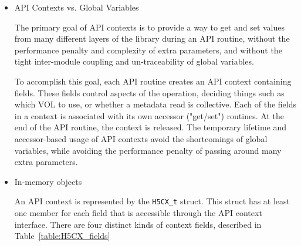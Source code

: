 \begin{itemize}

\item API Contexts vs. Global Variables

The primary goal of API contexts is to provide a way to get and set values from many different layers of the library during an API routine, without the performance penalty and complexity of extra parameters, and without the tight inter-module coupling and un-traceability of global variables.

To accomplish this goal, each API routine creates an API context containing fields. These fields control aspects of the operation, deciding things such as which VOL to use, or whether a metadata read is collective. Each of the fields in a context is associated with its own accessor ("get/set") routines. At the end of the API routine, the context is released. The temporary lifetime and accessor-based usage of API contexts avoid the shortcomings of global variables, while avoiding the performance penalty of passing around many extra parameters.

\item In-memory objects

An API context is represented by the \texttt{H5CX\_t} struct. This struct has at least one member for each field that is accessible through the API context interface. There are four distinct kinds of context fields, described in Table~\ref{table:H5CX_fields}


\end{itemize}
